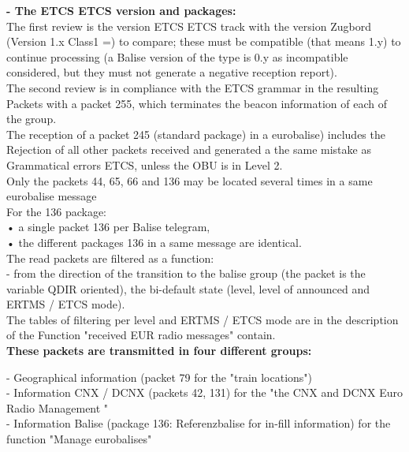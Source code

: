 \documentclass{template/openetcs_report}
\begin{document}
\textbf{- The ETCS ETCS version and packages:} \\

The first review is the version ETCS ETCS track with the version Zugbord 
(Version 1.x Class1 =) to compare; these must be compatible (that means 1.y) to 
continue processing (a Balise version of the type is 0.y as incompatible 
considered, but they must not generate a negative reception report). \\

The second review is in compliance with the ETCS grammar in the resulting 
Packets with a packet 255, which terminates the beacon information of each of the group. \\

The reception of a packet 245 (standard package) in a eurobalise) includes the 
Rejection of all other packets received and generated a the same mistake as 
Grammatical errors ETCS, unless the OBU is in Level 2. \\

Only the packets 44, 65, 66 and 136 may be located several times in a same eurobalise message\\ 
For the 136 package: \\
• a single packet 136 per Balise telegram, \\
• the different packages 136 in a same message are identical. \\

The read packets are filtered as a function: \\

- from the direction of the transition to the balise group (the packet is the variable 
QDIR oriented), 
the bi-default state (level, level of announced and ERTMS / ETCS mode). \\

The tables of filtering per level and ERTMS / ETCS mode are in the description of the 
Function "received EUR radio messages" contain.\\

\textbf{These packets are transmitted in four different groups:}

- Geographical information (packet 79 for the "train locations") \\

- Information CNX / DCNX (packets 42, 131) for the "the CNX and DCNX 
Euro Radio Management "\\

- Information Balise (package 136: Referenzbalise for in-fill information) for the function 
"Manage eurobalises" \\
\end{document}
